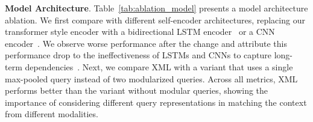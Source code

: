 \documentclass[runningheads]{llncs}
\newcommand{\ra}[1]{\renewcommand{\arraystretch}{#1}}
\begin{document}
\begin{table}[!t]
\setlength{\tabcolsep}{0.3em}
\ra{1.}
\centering
\small
\caption{Model architecture ablation on TVR \textit{val} set, VCMR task. Our full XML model in the last row is configured with transformer encoder and modular query. All models use both videos and subtitles}
\label{tab:ablation_model}
\end{table}

\kern1mm
\noindent\textbf{Model Architecture}.
Table~\ref{tab:ablation_model} presents a model architecture ablation. 
We first compare with different self-encoder architectures, replacing our transformer style encoder with a bidirectional LSTM encoder~\cite{Lei2018TVQALC} or a CNN encoder~\cite{yu2018qanet,lei2019tvqa+}. 
We observe worse performance after the change and attribute this performance drop to the ineffectiveness of LSTMs and CNNs to capture long-term dependencies~\cite{hochreiter2001gradient,vaswani2017attention}. 
Next, we compare XML with a variant that uses a single max-pooled query instead of two modularized queries. Across all metrics, XML performs better than the variant without modular queries, showing the importance of considering different query representations in matching the context from different modalities.
\end{document}
